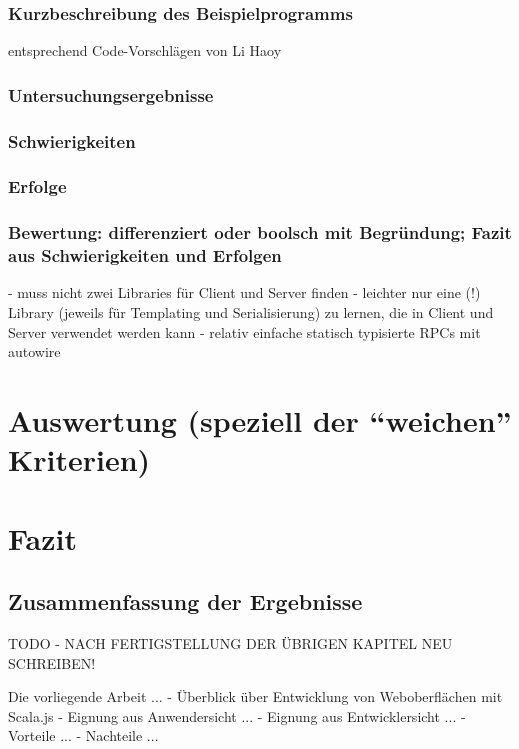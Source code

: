 \documentclass[a4paper, 12pt, hidelinks, listof=totoc, listoftables=totoc, bibliography=totoc]{scrreprt}
\begin{document}
\subsection{Kurzbeschreibung des Beispielprogramms}
entsprechend Code-Vorschlägen von Li Haoy\cite{haoyi.HOS}
\subsection{Untersuchungsergebnisse}
\subsection{Schwierigkeiten}
\subsection{Erfolge}
\subsection{Bewertung: differenziert oder boolsch mit Begründung; Fazit aus Schwierigkeiten und Erfolgen}
- muss nicht zwei Libraries für Client und Server finden
- leichter nur eine (!) Library (jeweils für Templating und Serialisierung) zu lernen, die in Client und Server verwendet werden kann
\cite[\#SharingCode]{haoyi.HOS}
- relativ einfache statisch typisierte RPCs mit autowire


\chapter{Auswertung (speziell der "`weichen"' Kriterien)}


\chapter{Fazit}

\section{Zusammenfassung der Ergebnisse}

TODO - NACH FERTIGSTELLUNG DER ÜBRIGEN KAPITEL NEU SCHREIBEN!

Die vorliegende Arbeit ...
- Überblick über Entwicklung von Weboberflächen mit Scala.js
- Eignung aus Anwendersicht ...
- Eignung aus Entwicklersicht ...
- Vorteile ...
- Nachteile ...
\end{document}
